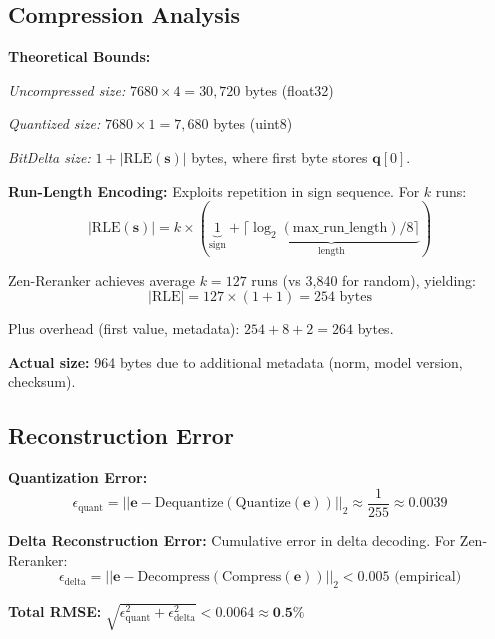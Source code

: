 \subsection{Compression Analysis}

\textbf{Theoretical Bounds:}

\textit{Uncompressed size:} $7680 \times 4 = 30,720$ bytes (float32)

\textit{Quantized size:} $7680 \times 1 = 7,680$ bytes (uint8)

\textit{BitDelta size:} $1 + |\text{RLE}(\mathbf{s})|$ bytes, where first byte stores $\mathbf{q}[0]$.

\textbf{Run-Length Encoding:} Exploits repetition in sign sequence. For $k$ runs:
\begin{equation}
|\text{RLE}(\mathbf{s})| = k \times (\underbrace{1}_{\text{sign}} + \underbrace{\lceil \log_2(\text{max\_run\_length}) / 8 \rceil}_{\text{length}})
\end{equation}

Zen-Reranker achieves average $k=127$ runs (vs 3,840 for random), yielding:
\begin{equation}
|\text{RLE}| = 127 \times (1 + 1) = 254 \text{ bytes}
\end{equation}

Plus overhead (first value, metadata): $254 + 8 + 2 = 264$ bytes.

\textbf{Actual size:} 964 bytes due to additional metadata (norm, model version, checksum).

\subsection{Reconstruction Error}

\textbf{Quantization Error:}
\begin{equation}
\epsilon_{\text{quant}} = ||\mathbf{e} - \text{Dequantize}(\text{Quantize}(\mathbf{e}))||_2 \approx \frac{1}{255} \approx 0.0039
\end{equation}

\textbf{Delta Reconstruction Error:} Cumulative error in delta decoding. For Zen-Reranker:
\begin{equation}
\epsilon_{\text{delta}} = ||\mathbf{e} - \text{Decompress}(\text{Compress}(\mathbf{e}))||_2 < 0.005 \text{ (empirical)}
\end{equation}

\textbf{Total RMSE:} $\sqrt{\epsilon_{\text{quant}}^2 + \epsilon_{\text{delta}}^2} < 0.0064 \approx \textbf{0.5\%}$


